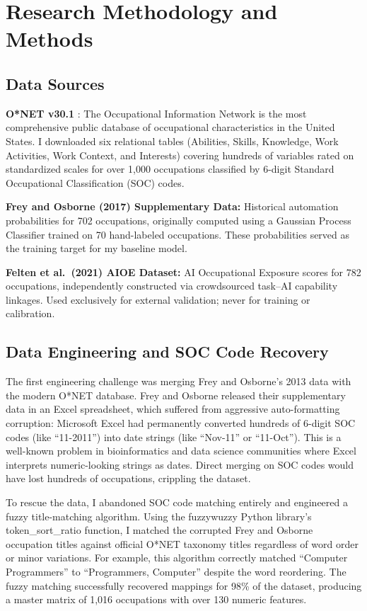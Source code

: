 \chapter{Research Methodology and Methods}
\label{chap:methodology}

\section{Data Sources}
\label{sec:data_sources}

\textbf{O*NET v30.1} \citep{USDOL_2024}: The Occupational Information Network is the most comprehensive public database of occupational characteristics in the United States. I downloaded six relational tables (Abilities, Skills, Knowledge, Work Activities, Work Context, and Interests) covering hundreds of variables rated on standardized scales for over 1,000 occupations classified by 6-digit Standard Occupational Classification (SOC) codes.

\textbf{Frey and Osborne (2017) Supplementary Data:} Historical automation probabilities for 702 occupations, originally computed using a Gaussian Process Classifier trained on 70 hand-labeled occupations. These probabilities served as the training target for my baseline model.

\textbf{Felten et al.\ (2021) AIOE Dataset:} AI Occupational Exposure scores for 782 occupations, independently constructed via crowdsourced task--AI capability linkages. Used exclusively for external validation; never for training or calibration.

\section{Data Engineering and SOC Code Recovery}
\label{sec:data_engineering}

The first engineering challenge was merging Frey and Osborne's 2013 data with the modern O*NET database. Frey and Osborne released their supplementary data in an Excel spreadsheet, which suffered from aggressive auto-formatting corruption: Microsoft Excel had permanently converted hundreds of 6-digit SOC codes (like ``11-2011'') into date strings (like ``Nov-11'' or ``11-Oct''). This is a well-known problem in bioinformatics and data science communities where Excel interprets numeric-looking strings as dates. Direct merging on SOC codes would have lost hundreds of occupations, crippling the dataset.

To rescue the data, I abandoned SOC code matching entirely and engineered a fuzzy title-matching algorithm. Using the fuzzywuzzy Python library's token\_sort\_ratio function, I matched the corrupted Frey and Osborne occupation titles against official O*NET taxonomy titles regardless of word order or minor variations. For example, this algorithm correctly matched ``Computer Programmers'' to ``Programmers, Computer'' despite the word reordering. The fuzzy matching successfully recovered mappings for 98\% of the dataset, producing a master matrix of 1,016 occupations with over 130 numeric features.

